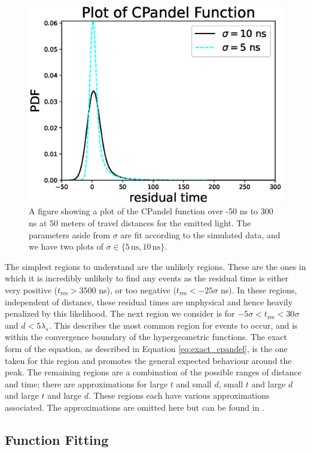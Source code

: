 \begin{figure}[H]
  \centering
  \includegraphics[width=12cm]{./Figures/cpandel_plot.eps}
  \caption{A figure showing a plot of the CPandel function over -50 ns to 300 ns at 50 meters of travel distances for the emitted light. The parameters aside from $\sigma$ are fit according to the simulated data, and we have two plots of $\sigma \in \{5\, \text{ns}, 10\, \text{ns}\}$.}
  \label{fig:cpandel}
\end{figure}

The simplest regions to understand are the unlikely regions. These are the ones in which it is incredibly unlikely to find any events as the residual time is either very positive ($t_{\text{res}} > 3500$ ns), or too negative ($t_{\text{res}} < -25\sigma$ ns). In these regions, independent of distance, these residual times are unphysical and hence heavily penalized by this likelihood. The next region we consider is for $-5\sigma < t_{\text{res}} < 30\sigma$ and $d < 5\lambda_{s}$. This describes the most common region for events to occur, and is within the convergence boundary of the hypergeometric functions. The exact form of the equation, as described in Equation \ref{eq:exact_cpandel}, is the one taken for this region and promotes the general expected behaviour around the peak. The remaining regions are a combination of the possible ranges of distance and time; there are approximations for large $t$ and small $d$, small $t$ and large $d$ and large $t$ and large $d$. These regions each have various approximations associated. The approximations are omitted here but can be found in \cite{conv}.

\subsection{Function Fitting}

